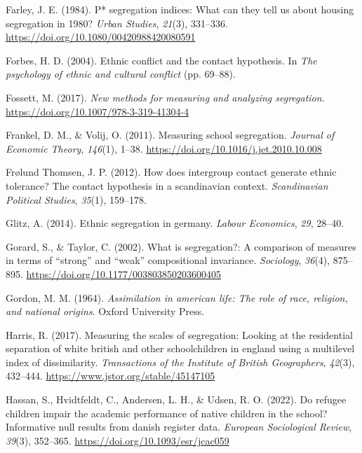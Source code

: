 \documentclass[
]{book}
\newlength{\cslhangindent}
\newenvironment{CSLReferences}[2] %
 {\begin{list}{}{%
  \setlength{\itemindent}{0pt}
  \setlength{\leftmargin}{0pt}
  \setlength{\parsep}{0pt}
  \ifodd #1
   \setlength{\leftmargin}{\cslhangindent}
   \setlength{\itemindent}{-1\cslhangindent}
  \fi
  \setlength{\itemsep}{#2\baselineskip}}}
 {\end{list}}
\begin{document}
\begin{CSLReferences}{1}{0}
Farley, J. E. (1984). P* segregation indices: What can they tell us about housing segregation in 1980? \emph{Urban Studies}, \emph{21}(3), 331--336. \url{https://doi.org/10.1080/00420988420080591}

Forbes, H. D. (2004). Ethnic conflict and the contact hypothesis. In \emph{The psychology of ethnic and cultural conflict} (pp. 69--88).

Fossett, M. (2017). \emph{New methods for measuring and analyzing segregation}. \url{https://doi.org/10.1007/978-3-319-41304-4}

Frankel, D. M., \& Volij, O. (2011). Measuring school segregation. \emph{Journal of Economic Theory}, \emph{146}(1), 1--38. \url{https://doi.org/10.1016/j.jet.2010.10.008}

Frølund Thomsen, J. P. (2012). How does intergroup contact generate ethnic tolerance? The contact hypothesis in a scandinavian context. \emph{Scandinavian Political Studies}, \emph{35}(1), 159--178.

Glitz, A. (2014). Ethnic segregation in germany. \emph{Labour Economics}, \emph{29}, 28--40.

Gorard, S., \& Taylor, C. (2002). What is segregation?: A comparison of measures in terms of {``strong''} and {``weak''} compositional invariance. \emph{Sociology}, \emph{36}(4), 875--895. \url{https://doi.org/10.1177/003803850203600405}

Gordon, M. M. (1964). \emph{Assimilation in american life: The role of race, religion, and national origins}. Oxford University Press.

Harris, R. (2017). Measuring the scales of segregation: Looking at the residential separation of white british and other schoolchildren in england using a multilevel index of dissimilarity. \emph{Transactions of the Institute of British Geographers}, \emph{42}(3), 432--444. \url{https://www.jstor.org/stable/45147105}

Hassan, S., Hvidtfeldt, C., Andersen, L. H., \& Udsen, R. O. (2022). Do refugee children impair the academic performance of native children in the school? Informative null results from danish register data. \emph{European Sociological Review}, \emph{39}(3), 352--365. \url{https://doi.org/10.1093/esr/jcac059}


\end{CSLReferences}
\end{document}
